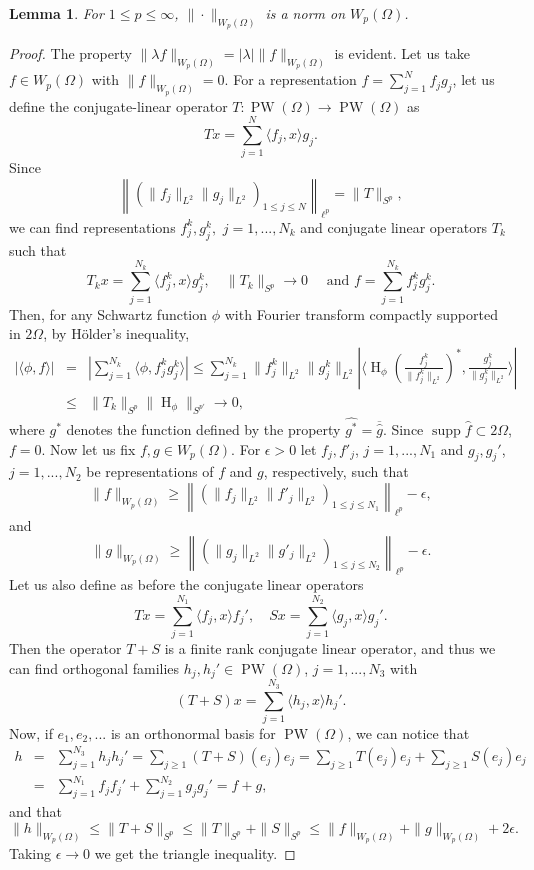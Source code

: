 \documentclass{amsart}
\theoremstyle{plain}
\newtheorem{lm}[theo]{Lemma}
\DeclareMathOperator{\Ha}{H}
\DeclareMathOperator{\PW}{PW}
\DeclareMathOperator{\supp}{supp}
\begin{document}
\begin{lm}\label{WpNorm}
	For $1\leq p\leq\infty$, $\|\cdot\|_{W_p(\Omega)}$ is a norm on $W_p(\Omega)$.
\end{lm}
\begin{proof}
	The property $\|\lambda f\|_{W_p(\Omega)}=|\lambda|\| f\|_{W_p(\Omega)}$ is evident. Let us take $f\in W_p(\Omega)$ with $\|f\|_{W_p(\Omega)}=0$. For a representation $f=\sum_{j=1}^N f_j g_j$, let us define the conjugate-linear operator $T:\PW(\Omega)\to \PW(\Omega)$ as
	$$Tx=\sum_{j=1}^N\langle f_j,x\rangle g_j.$$
	Since $$ \left\| (\|f_j\|_{L^2}\|g_j\|_{L^2})_{1\leq j\leq N}\right\|_{\ell^p}=\|T\|_{S^p},$$ we can find representations $f_j^k,g_j^k,$ $j=1,...,N_k$ and conjugate linear operators $T_k$ such that $$T_kx=\sum_{j=1}^{N_k}\langle f_j^k,x\rangle g_j^k,\quad \|T_k\|_{S^p}\to 0 \quad \text{ and } f=\sum_{j=1}^{N_k}f_j^k g_j^k.$$
	Then, for any Schwartz function $\phi$ with Fourier transform compactly supported in $2\Omega$, by H\"{o}lder's inequality,
	\begin{eqnarray} 
		|\langle \phi,f\rangle|&=&|\sum_{j=1}^{N_k}\langle \phi, f_j^k g_j^k\rangle|\leq\sum_{j=1}^{N_k}\|f_j^k\|_{L^2}\|g_j^k\|_{L^2}|\langle \Ha_\phi (\frac{f_j^k}{\|f_j^k\|_{L^2}})^\ast, \frac{g_j^k}{\|g_j^k\|_{L^2}}\rangle| \nonumber \\ &\leq& \|T_k\|_{S^p}\|\Ha_\phi\|_{S^{p'}}\to 0, \nonumber
	\end{eqnarray} 
	where $g^\ast$ denotes the function defined by the property $\widehat{g^\ast}=\overline{\hat{g}}.$
	Since $\supp\hat{f}\subset 2\Omega$, $f=0$. Now let us fix $f,g\in W_p(\Omega)$. For $\epsilon>0$ let $f_j,f'_j$, $j=1,...,N_1$ and $g_j,g_j'$, $j=1,...,N_2$ be representations of $f$ and $g$, respectively, such that
	$$\|f\|_{W_p(\Omega)}\geq \left\| (\|f_j\|_{L^2}\|f'_j\|_{L^2})_{1\leq j\leq N_1}\right\|_{\ell^p}-\epsilon,$$ and  $$\|g\|_{W_p(\Omega)}\geq \left\| (\|g_j\|_{L^2}\|g'_j\|_{L^2})_{1\leq j\leq N_2}\right\|_{\ell^p}-\epsilon.$$
Let us also define as before the conjugate linear operators
	$$Tx=\sum_{j=1}^{N_1}\langle f_j,x\rangle f_j',\quad Sx=\sum_{j=1}^{N_2}\langle g_j,x\rangle g_j'.$$ Then the operator $T+S$ is a finite rank conjugate linear operator, and thus we can find orthogonal families $h_j,h_j'\in \PW(\Omega)$, $j=1,...,N_3$ with 
	$$(T+S)x=\sum_{j=1}^{N_3}\langle h_j,x\rangle h_j'.$$ Now, if $e_1,e_2,...$ is an orthonormal basis for $\PW(\Omega)$, we can notice that
	\begin{eqnarray} h&=&\sum_{j=1}^{N_3}h_jh_j'=\sum_{j\geq 1}(T+S)(e_j)e_j=\sum_{j\geq 1}T(e_j)e_j+\sum_{j\geq 1}S(e_j)e_j \nonumber \\
		&=&\sum_{j=1}^{N_1}f_jf_j'+\sum_{j=1}^{N_2}g_jg_j'=f+g,\nonumber
	\end{eqnarray}
	and that
	$$\|h\|_{W_p(\Omega)}\leq \|T+S\|_{S^p}\leq \|T\|_{S^p}+\|S\|_{S^p}\leq \|f\|_{W_p(\Omega)}+\|g\|_{W_p(\Omega)}+2\epsilon.$$
	Taking $\epsilon\to 0$ we get the triangle inequality.
\end{proof}
\end{document}

